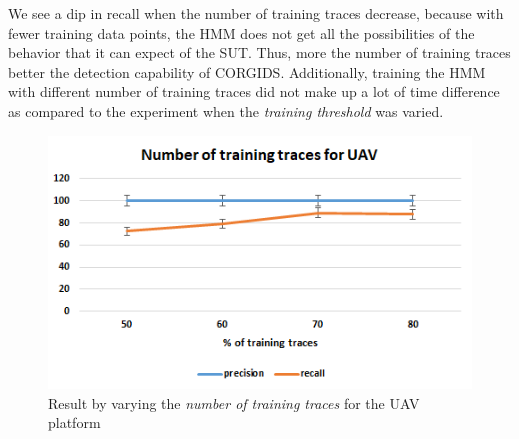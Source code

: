 \begin{itemize}
We see a dip in recall when the number of training traces decrease, because with fewer training data points, the \ac{HMM} does not get all the possibilities of the behavior that it can expect of the \ac{SUT}. Thus, more the number of training traces better the detection capability of \ac{CORGIDS}. Additionally, training the \ac{HMM} with different number of training traces did not make up a lot of time difference as compared to the experiment when the \textit{training threshold} was varied.

\begin{figure}[ht]
    \centering
    \includegraphics[scale=0.65,keepaspectratio = true]{Graphics/UAV_traces.png}
    \caption{Result by varying the \textit{number of training traces} for the UAV platform}
    \label{fig:UAV_traces}
\end{figure}

\end{itemize}

